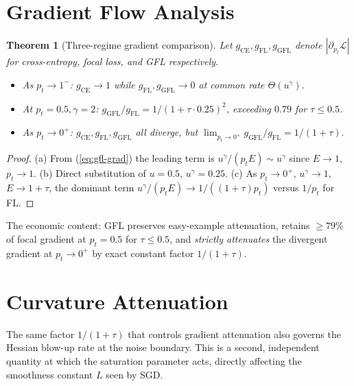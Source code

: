 \documentclass[conference]{IEEEtran}
\newtheorem{theorem}{Theorem}
\theoremstyle{definition}
\begin{document}
\section{Gradient Flow Analysis}
\label{sec:gradflow}

\begin{theorem}[Three-regime gradient comparison]\label{thm:grad-comp}
Let $g_{\mathrm{CE}}, g_{\mathrm{FL}}, g_{\mathrm{GFL}}$ denote $|\partial_{p_t}\mathcal{L}|$ for cross-entropy, focal loss, and GFL respectively.
\begin{itemize}[leftmargin=1.6em]
\item[(a)] As $p_t \to 1^-$: $g_{\mathrm{CE}} \to 1$ while $g_{\mathrm{FL}}, g_{\mathrm{GFL}} \to 0$ at common rate $\Theta(u^\gamma)$.
\item[(b)] At $p_t = 0.5, \gamma = 2$: $g_{\mathrm{GFL}}/g_{\mathrm{FL}} = 1/(1+\tau\cdot 0.25)^2$, exceeding $0.79$ for $\tau \le 0.5$.
\item[(c)] As $p_t \to 0^+$: $g_{\mathrm{CE}}, g_{\mathrm{FL}}, g_{\mathrm{GFL}}$ all diverge, but
\(
\lim_{p_t \to 0^+} g_{\mathrm{GFL}}/g_{\mathrm{FL}} = 1/(1+\tau).
\)
\end{itemize}
\end{theorem}

\begin{proof}
(a) From (\ref{eq:gfl-grad}) the leading term is $u^\gamma/(p_t E) \sim u^\gamma$ since $E \to 1$, $p_t \to 1$. (b) Direct substitution of $u = 0.5$, $u^\gamma = 0.25$. (c) As $p_t \to 0^+$, $u^\gamma \to 1$, $E \to 1+\tau$, the dominant term $u^\gamma/(p_t E) \to 1/((1+\tau)p_t)$ versus $1/p_t$ for FL.
\end{proof}

The economic content: GFL preserves easy-example attenuation, retains $\ge 79\%$ of focal gradient at $p_t = 0.5$ for $\tau \le 0.5$, and \emph{strictly attenuates} the divergent gradient at $p_t \to 0^+$ by exact constant factor $1/(1+\tau)$.

\section{Curvature Attenuation}
\label{sec:curvature}

The same factor $1/(1+\tau)$ that controls gradient attenuation also governs the Hessian blow-up rate at the noise boundary. This is a second, independent quantity at which the saturation parameter acts, directly affecting the smoothness constant $L$ seen by SGD.
\end{document}
